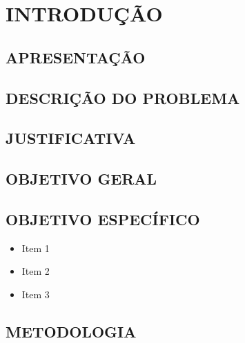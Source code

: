 \chapter{INTRODUÇÃO} %
\lipsum[1-2]
\section{APRESENTAÇÃO}
\lipsum[1-1]

\section{DESCRIÇÃO DO PROBLEMA}
\lipsum[1-1]

\section{JUSTIFICATIVA}
\lipsum[1-1]

\section{OBJETIVO GERAL}
\lipsum[1-1]

 \section{OBJETIVO ESPECÍFICO}

 \begin{itemize}
	\item Item 1
	\item Item 2
	\item Item 3
\end{itemize}

 \section{METODOLOGIA}
 \lipsum[1-1]
